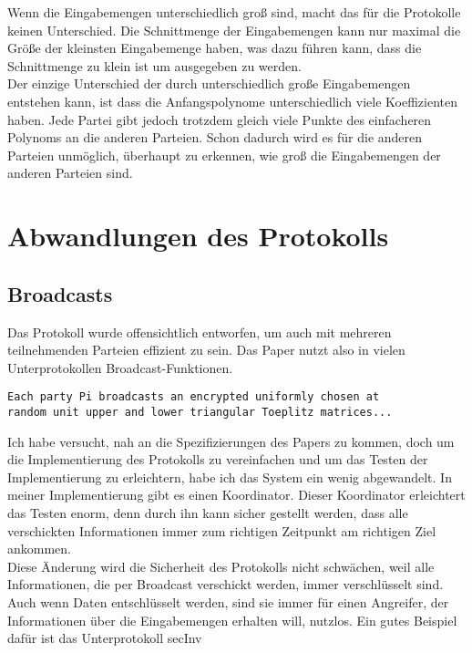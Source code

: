 Wenn die Eingabemengen unterschiedlich groß sind, macht das für die Protokolle keinen Unterschied. Die Schnittmenge der Eingabemengen kann nur maximal die Größe der kleinsten Eingabemenge haben, was dazu führen kann, dass die Schnittmenge zu klein ist um ausgegeben zu werden.\\
Der einzige Unterschied der durch unterschiedlich große Eingabemengen entstehen kann, ist dass die Anfangspolynome unterschiedlich viele Koeffizienten haben.
Jede Partei gibt jedoch trotzdem gleich viele Punkte des einfacheren Polynoms an die anderen Parteien. Schon dadurch wird es für die anderen Parteien unmöglich, überhaupt zu erkennen, wie groß die Eingabemengen der anderen Parteien sind.\\

\section{Abwandlungen des Protokolls} \label{Änderungen}
\subsection{Broadcasts}
Das Protokoll wurde offensichtlich entworfen, um auch mit mehreren teilnehmenden Parteien effizient zu sein.
Das Paper \cite{Doettling2021} nutzt also in vielen Unterprotokollen Broadcast-Funktionen. 


\begin{lstlisting}[firstnumber=1, caption = 
Beispiel: Ausschnitt von secRank \cite{Doettling2021}]
Each party Pi broadcasts an encrypted uniformly chosen at
random unit upper and lower triangular Toeplitz matrices...
\end{lstlisting}

Ich habe versucht, nah an die Spezifizierungen des Papers zu kommen, doch 
um die Implementierung des Protokolls zu vereinfachen und um das Testen der Implementierung zu erleichtern, habe ich das System ein wenig abgewandelt. In meiner Implementierung gibt es einen Koordinator. Dieser Koordinator erleichtert das Testen enorm, denn durch ihn kann sicher gestellt werden, dass alle \glqq verschickten\grqq{} Informationen immer zum richtigen Zeitpunkt am richtigen Ziel ankommen.\\
Diese Änderung wird die Sicherheit des Protokolls nicht schwächen, weil alle Informationen, die per Broadcast verschickt werden, immer verschlüsselt sind.
Auch wenn Daten entschlüsselt werden, sind sie immer für einen Angreifer, der Informationen über die Eingabemengen erhalten will, nutzlos. Ein gutes Beispiel dafür ist das Unterprotokoll secInv \\

